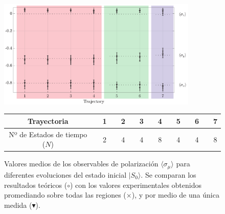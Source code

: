 \begin{figure}[h!]
\centering
\includegraphics[width=0.85\textwidth]{salida4.pdf}
\caption{Valores medios de los observables de  polarización %
$\langle\sigma_{\mu}
\rangle$ para diferentes evoluciones del estado inicial $|S_0\rangle$. Se comparan los resultados teóricos  ($\circ$) con los valores experimentales obtenidos promediando sobre todas las regiones  ($\times$), y por medio de una \'unica medida ($\blacktriangledown$).}
\begin{tabular}{ccccccccccccccc}
    \hline
{\rm Trayectoria} && 1 && 2 && 3 && 4 && 5 && 6 && 7  \\
    \hline
 {\rm Nº de Estados de tiempo} ($N$) && 2 && 4 && 4 && 8 && 4 && 4 && 8  \\
    \hline
    \end{tabular}
\label{fig:stokes}
\end{figure}

